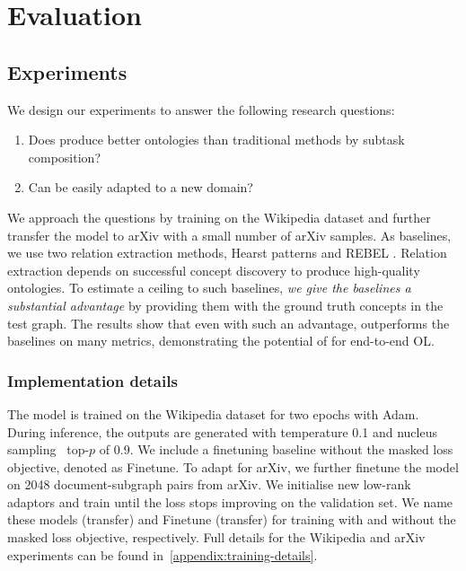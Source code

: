 \chapter{Evaluation}

\section{Experiments}

We design our experiments to answer the following research questions:
\begin{enumerate}
    \item Does \name produce better ontologies than traditional methods by subtask composition?
    \item Can \name be easily adapted to a new domain?
\end{enumerate}
We approach the questions by training \name on the Wikipedia dataset and further transfer the model to arXiv with a small number of arXiv samples. As baselines, we use two relation extraction methods, Hearst patterns \cite{hearst1998automated,roller2018hearst} and REBEL \cite{cabot2021rebel}. Relation extraction depends on successful concept discovery to produce high-quality ontologies. To estimate a ceiling to such baselines, \emph{we give the baselines a substantial advantage} by providing them with the ground truth concepts in the test graph. The results show that even with such an advantage, \name outperforms the baselines on many metrics, demonstrating the potential of \name for end-to-end OL.

\subsection{Implementation details}  \label{sec:implementation}


The model is trained on the Wikipedia dataset for two epochs with Adam. During inference, the outputs are generated with temperature 0.1 and nucleus sampling~\cite{holtzman2019curious} top-$p$ of 0.9. We include a finetuning baseline without the masked loss objective, denoted as Finetune. To adapt \name for arXiv, we further finetune the model on 2048 document-subgraph pairs from arXiv. We initialise new low-rank adaptors and train until the loss stops improving on the validation set. We name these models \name (transfer) and Finetune (transfer) for training with and without the masked loss objective, respectively. Full details for the Wikipedia and arXiv experiments can be found in~\cref{appendix:training-details}.


